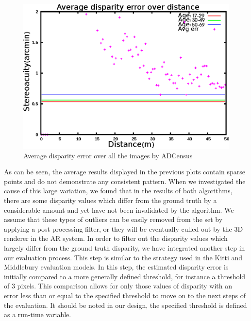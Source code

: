 \begin{figure}[H]
\centering
\includegraphics[scale=0.8]{adcenmsk1000}
\caption{Average disparity error over all the images by ADCensus}
\label{fig:mskmapadc}
\end{figure} 

As can be seen, the average results displayed in the previous plots contain sparse points and 
do not demonstrate any consistent pattern. When we investigated the cause of this large variation, we found that in
the results of both algorithms, there are some disparity values which differ from the ground truth 
by a considerable amount and yet have not been invalidated by the
algorithm. We assume that these types of outliers can be easily removed from the set by applying a post processing filter, or 
they will be eventually culled out by the 3D renderer in the AR system. 
In order to filter out the disparity values which largely differ from the ground truth disparity, we have integrated another 
step in our evaluation process. This step is similar to the strategy used in the Kitti and Middlebury evaluation models.
In this step, the estimated disparity error is initially compared to a more generally defined threshold, for instance a threshold of 3 pixels.
This comparison allows for only those values of disparity with an error less than or equal to the specified threshold to 
move on to the next steps of the evaluation. It should be noted in our design, the specified threshold is defined as a run-time variable. 

